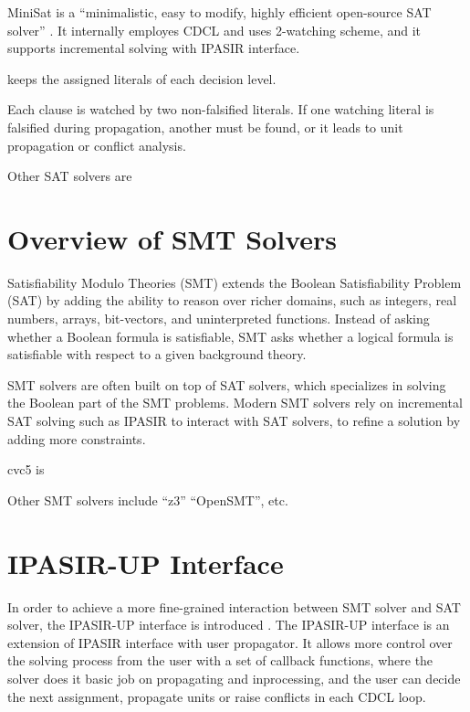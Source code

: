 MiniSat is a ``minimalistic, easy to modify, highly efficient open-source SAT solver'' . It internally employes CDCL and uses 2-watching scheme, and it supports incremental solving with IPASIR interface.

 keeps the assigned literals of each decision level.


Each clause is watched by two non-falsified literals. If one watching literal is falsified during propagation, another must be found, or it leads to unit propagation or conflict analysis.

Other SAT solvers are 

\section{Overview of SMT Solvers}

Satisfiability Modulo Theories (SMT) extends the Boolean Satisfiability Problem (SAT) by adding the ability to reason over richer domains, such as integers, real numbers, arrays, bit-vectors, and uninterpreted functions. Instead of asking whether a Boolean formula is satisfiable, SMT asks whether a logical formula is satisfiable with respect to a given background theory.

SMT solvers are often built on top of SAT solvers, which specializes in solving the Boolean part of the SMT problems. Modern SMT solvers rely on incremental SAT solving such as IPASIR to interact with SAT solvers, to refine a solution by adding more constraints.

cvc5 is 

Other SMT solvers include ``z3'' ``OpenSMT'', etc.

\section{IPASIR-UP Interface}

In order to achieve a more fine-grained interaction between SMT solver and SAT solver, the IPASIR-UP interface is introduced \cite{fazekas_et_al:LIPIcs.SAT.2023.8}. The IPASIR-UP interface is an extension of IPASIR interface with user propagator. It allows more control over the solving process from the user with a set of callback functions, where the solver does it basic job on propagating and inprocessing, and the user can decide the next assignment, propagate units or raise conflicts in each CDCL loop.

